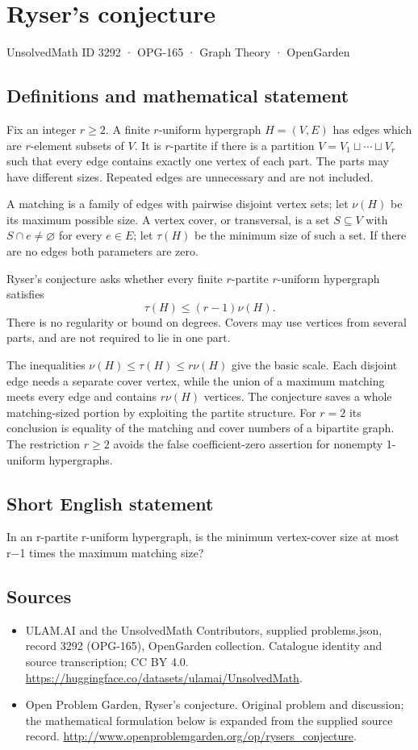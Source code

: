 \documentclass[11pt,a4paper]{article}
\begin{document}
\section*{Ryser's conjecture}\label{3292}
{\small UnsolvedMath ID 3292 · OPG-165 · Graph Theory · OpenGarden}
\subsection{Definitions and mathematical statement}
Fix an integer $r\ge2$. A finite $r$-uniform hypergraph $H=(V,E)$ has
edges which are $r$-element subsets of $V$. It is $r$-partite if there
is a partition $V=V_1\sqcup\cdots\sqcup V_r$ such that every edge
contains exactly one vertex of each part. The parts may have different
sizes. Repeated edges are unnecessary and are not included.

A matching is a family of edges with pairwise disjoint vertex sets;
let $\nu(H)$ be its maximum possible size. A vertex cover, or
transversal, is a set $S\subseteq V$ with $S\cap e\ne\varnothing$ for
every $e\in E$; let $\tau(H)$ be the minimum size of such a set. If
there are no edges both parameters are zero.

Ryser's conjecture asks whether every finite $r$-partite $r$-uniform
hypergraph satisfies
\[
                             \tau(H)\le(r-1)\nu(H).
\]
There is no regularity or bound on degrees. Covers may use vertices
from several parts, and are not required to lie in one part.

The inequalities $\nu(H)\le\tau(H)\le r\nu(H)$ give the basic scale.
Each disjoint edge needs a separate cover vertex, while the union of
a maximum matching meets every edge and contains $r\nu(H)$ vertices.
The conjecture saves a whole matching-sized portion by exploiting the
partite structure. For $r=2$ its conclusion is equality of the matching
and cover numbers of a bipartite graph. The restriction $r\ge2$
avoids the false coefficient-zero assertion for nonempty 1-uniform
hypergraphs.
\subsection{Short English statement}
In an r-partite r-uniform hypergraph, is the minimum vertex-cover size at most r−1 times the maximum matching size?
\subsection{Sources}
\begin{itemize}
\item[S1] ULAM.AI and the UnsolvedMath Contributors, supplied problems.json, record 3292 (OPG-165), OpenGarden collection. Catalogue identity and source transcription; CC BY 4.0.
\url{https://huggingface.co/datasets/ulamai/UnsolvedMath}.
\item[S2] Open Problem Garden, Ryser's conjecture. Original problem and discussion; the mathematical formulation below is expanded from the supplied source record.
\url{http://www.openproblemgarden.org/op/rysers_conjecture}.
\end{itemize}
\end{document}

